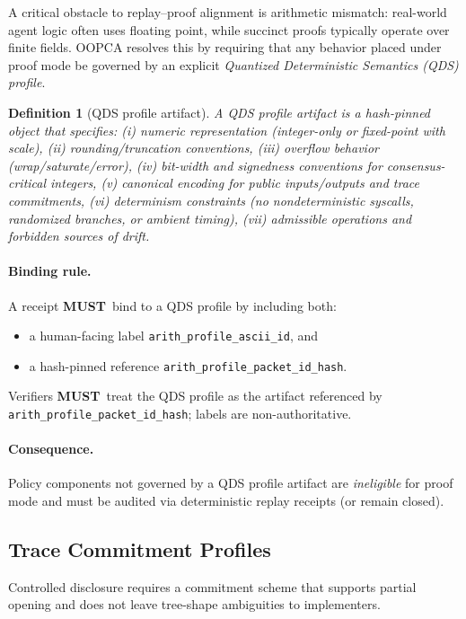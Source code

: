 \documentclass[11pt]{article}
\newcommand{\MUST}{\textbf{MUST}}
\newtheorem{definition}{Definition}
\begin{document}
A critical obstacle to replay--proof alignment is arithmetic mismatch: real-world agent logic often uses floating point, while succinct proofs typically operate over finite fields. OOPCA resolves this by requiring that any behavior placed under proof mode be governed by an explicit \emph{Quantized Deterministic Semantics (QDS) profile}.

\begin{definition}[QDS profile artifact]
A QDS profile artifact is a hash-pinned object that specifies:
(i) numeric representation (integer-only or fixed-point with scale),
(ii) rounding/truncation conventions,
(iii) overflow behavior (wrap/saturate/error),
(iv) bit-width and signedness conventions for consensus-critical integers,
(v) canonical encoding for public inputs/outputs and trace commitments,
(vi) determinism constraints (no nondeterministic syscalls, randomized branches, or ambient timing),
(vii) admissible operations and forbidden sources of drift.
\end{definition}

\paragraph{Binding rule.}
A receipt \MUST\ bind to a QDS profile by including both:
\begin{itemize}[leftmargin=1.2em]
  \item a human-facing label \texttt{arith\_profile\_ascii\_id}, and
  \item a hash-pinned reference \texttt{arith\_profile\_packet\_id\_hash}.
\end{itemize}
Verifiers \MUST\ treat the QDS profile as the artifact referenced by \texttt{arith\_profile\_packet\_id\_hash}; labels are non-authoritative.

\paragraph{Consequence.}
Policy components not governed by a QDS profile artifact are \emph{ineligible} for proof mode and must be audited via deterministic replay receipts (or remain closed).

\subsection{Trace Commitment Profiles}\label{sec:tracecommit}

Controlled disclosure requires a commitment scheme that supports partial opening and does not leave tree-shape ambiguities to implementers.
\end{document}
